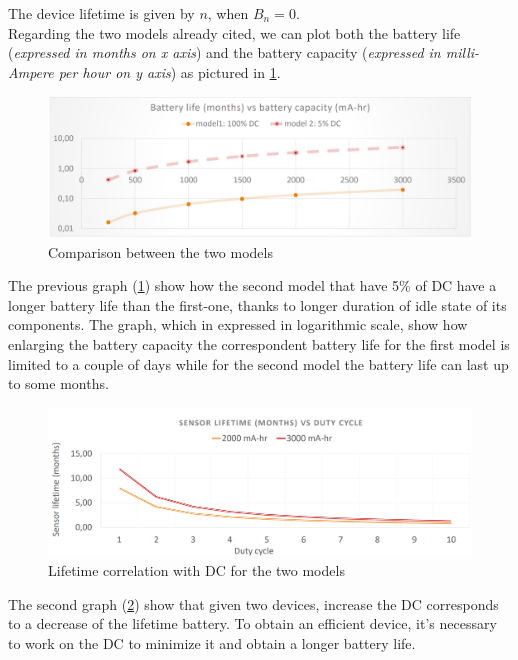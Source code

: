 \documentclass[10pt,a4paper]{report}
\theoremstyle{definition}
\begin{document}
The device lifetime is given by $n$, when $B_{n} = 0$.\\
Regarding the two models already cited, we can plot both the battery life (\textit{expressed in months on x axis}) and the battery capacity (\textit{expressed in milli-Ampere per hour on y axis}) as pictured in \ref{battery-vs-capacity}.
\begin{figure}[h]
	\centering\includegraphics[scale=0.30]{images/Pasted image 20230327151650.png}
	\caption{Comparison between the two models}
	\label{battery-vs-capacity}
\end{figure}

The previous graph (\ref{battery-vs-capacity}) show how the second model that have 5\% of DC have a longer battery life than the first-one, thanks to longer duration of idle state of its components. The graph, which in expressed in logarithmic scale, show how enlarging the battery capacity the correspondent battery life for the first model is limited to a couple of days while for the second model the battery life can last up to some months.
\begin{figure}[h!]
	\centering\includegraphics[scale=0.25]{images/Pasted image 20230327151825.png}
	\caption{Lifetime correlation with DC for the two models}
\label{lifetime-vs-dc}
\end{figure}

The second graph (\ref{lifetime-vs-dc}) show that given two devices, increase the DC corresponds to a decrease of the lifetime battery. To obtain an efficient device, it's necessary to work on the DC to minimize it and obtain a longer battery life.
\end{document}
